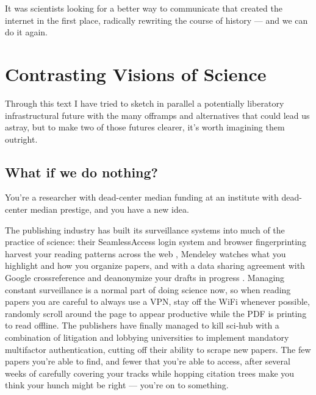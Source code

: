 It was scientists looking for a
better way to communicate that created the internet in the first place,
radically rewriting the course of history \citep{kleinrockEarlyHistoryInternet2010}  --- and we can do it again.

\hypertarget{contrasting-visions-of-science}{%
\section{Contrasting Visions of
Science}\label{contrasting-visions-of-science}}

Through this text I have tried to sketch in parallel a potentially
liberatory infrastructural future with the many offramps and
alternatives that could lead us astray, but to make two of those futures
clearer, it's worth imagining them outright.

\hypertarget{what-if-we-do-nothing}{%
\subsection{What if we do nothing?}\label{what-if-we-do-nothing}}

You're a researcher with dead-center median funding at an institute with
dead-center median prestige, and you have a new idea.

The publishing industry has built its surveillance systems into much of
the practice of science: their SeamlessAccess login system and browser
fingerprinting harvest your reading patterns across the web\citep{sariGuestPostTechnology2018, brembsSNSINewPRISM2020, nisoNISORP272019Recommended2019, snsiCybersecurityLandscapeProtecting2020, SeamlessAccessActionSeamlessAccess} , Mendeley watches what you
highlight and how you organize papers, and with a data sharing agreement
with Google crossreference and deanonymize your drafts in progress \citep{pooleySurveillancePublishing2021} . Managing constant
surveillance is a normal part of doing science now, so when reading
papers you are careful to always use a VPN, stay off the WiFi whenever
possible, randomly scroll around the page to appear productive while the
PDF is printing to read offline. The publishers have finally managed to
kill sci-hub with a combination of litigation and lobbying universities
to implement mandatory multifactor authentication, cutting off their
ability to scrape new papers. The few papers you're able to find, and
fewer that you're able to access, after several weeks of carefully
covering your tracks while hopping citation trees make you think your
hunch might be right --- you're on to something.

